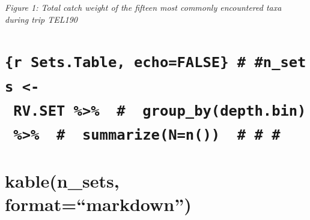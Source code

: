 \documentclass[12pt,]{article}
\begin{document}
\emph{Figure 1: Total catch weight of the fifteen most commonly
encountered taxa during trip TEL190}

\section{}\label{section}

\section{\texorpdfstring{\texttt{\{r\ Sets.Table,\ echo=FALSE\}\ \#\ \#n\_sets\ \textless{}-\ RV.SET\ \%\textgreater{}\%\ \ \#\ \ group\_by(depth.bin)\ \%\textgreater{}\%\ \ \#\ \ summarize(N=n())\ \ \#\ \#\ \#}}{\{r Sets.Table, echo=FALSE\} \# \#n\_sets \textless{}- RV.SET \%\textgreater{}\%  \#  group\_by(depth.bin) \%\textgreater{}\%  \#  summarize(N=n())  \# \# \#}}\label{r-sets.table-echofalse-n_sets---rv.set-group_bydepth.bin-summarizenn}

\section{\texorpdfstring{kable(n\_sets,
format=``markdown'')}{kable(n\_sets, format=markdown)}}\label{kablen_sets-formatmarkdown}
\end{document}
